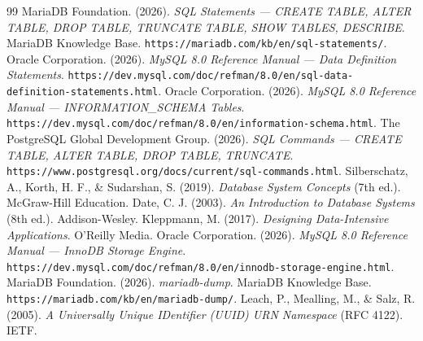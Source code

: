 \documentclass[11pt,a4paper]{article}
\begin{document}
\begin{thebibliography}{99}
	 MariaDB Foundation. (2026). \textit{SQL Statements --- CREATE TABLE, ALTER TABLE, DROP TABLE, TRUNCATE TABLE, SHOW TABLES, DESCRIBE}. MariaDB Knowledge Base. \texttt{https://mariadb.com/kb/en/sql-statements/}.
	 Oracle Corporation. (2026). \textit{MySQL 8.0 Reference Manual --- Data Definition Statements}. \texttt{https://dev.mysql.com/doc/refman/8.0/en/sql-data-definition-statements.html}.
	 Oracle Corporation. (2026). \textit{MySQL 8.0 Reference Manual --- INFORMATION\_SCHEMA Tables}. \texttt{https://dev.mysql.com/doc/refman/8.0/en/information-schema.html}.
	 The PostgreSQL Global Development Group. (2026). \textit{SQL Commands --- CREATE TABLE, ALTER TABLE, DROP TABLE, TRUNCATE}. \texttt{https://www.postgresql.org/docs/current/sql-commands.html}.
	 Silberschatz, A., Korth, H. F., \& Sudarshan, S. (2019). \textit{Database System Concepts} (7th ed.). McGraw-Hill Education.
	 Date, C. J. (2003). \textit{An Introduction to Database Systems} (8th ed.). Addison-Wesley.
	 Kleppmann, M. (2017). \textit{Designing Data-Intensive Applications}. O'Reilly Media.
	 Oracle Corporation. (2026). \textit{MySQL 8.0 Reference Manual --- InnoDB Storage Engine}. \texttt{https://dev.mysql.com/doc/refman/8.0/en/innodb-storage-engine.html}.
	 MariaDB Foundation. (2026). \textit{mariadb-dump}. MariaDB Knowledge Base. \texttt{https://mariadb.com/kb/en/mariadb-dump/}.
	 Leach, P., Mealling, M., \& Salz, R. (2005). \textit{A Universally Unique IDentifier (UUID) URN Namespace} (RFC 4122). IETF.
\end{thebibliography}
\end{document}
